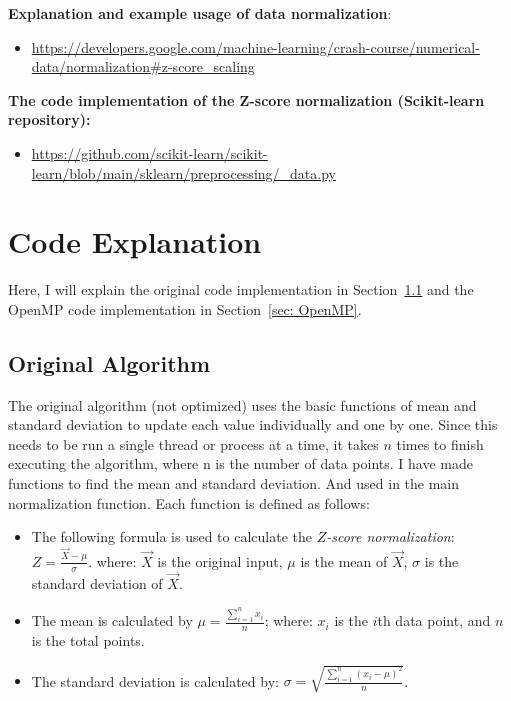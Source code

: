 \documentclass{article}
\newcommand{\zonenorm}{\textit{$Z$-score normalization}}
\begin{document}
\textbf{Explanation and example usage of data normalization}:
\begin{itemize}  \item \url{https://developers.google.com/machine-learning/crash-course/numerical-data/normalization#z-score_scaling} \end{itemize}
\textbf{The code implementation of the Z-score normalization (Scikit-learn repository):}
\begin{itemize}  \item \url{https://github.com/scikit-learn/scikit-learn/blob/main/sklearn/preprocessing/_data.py} \end{itemize}


\section{Code Explanation} \label{sec:code}


Here, I will explain the original code implementation in Section~\ref{sec: original} and the OpenMP code implementation in Section~\ref{sec: OpenMP}.

\subsection{Original Algorithm}\label{sec: original}
The original algorithm (not optimized) uses the basic functions of mean and standard deviation to update each value individually and one by one.
% 
Since this needs to be run a single thread or process at a time, it takes $n$ times to finish executing the algorithm, where n is the number of data points.
% 
I have made functions to find the mean and standard deviation.
And used in the main normalization function.
Each function is defined as follows:

\begin{itemize}
    \item The following formula is used to calculate the \zonenorm{}: $Z = \frac{\vec{X} - \mu}{\sigma}$. where: $\vec{X}$ is the original input,  $\mu$ is the mean of $\vec{X}$, $\sigma$ is the standard deviation of $\vec{X}$.
    \item The mean is calculated by  $\mu = \frac{\sum_{i=1}^{n} x_i}{n}$; where: $x_i$ is the $i$th data point, and $n$ is the total points.
    \item The standard deviation is calculated by: $\sigma = \sqrt{\frac{\sum_{i=1}^{n} (x_i - \mu)^2}{n}}$.
\end{itemize}
\end{document}
